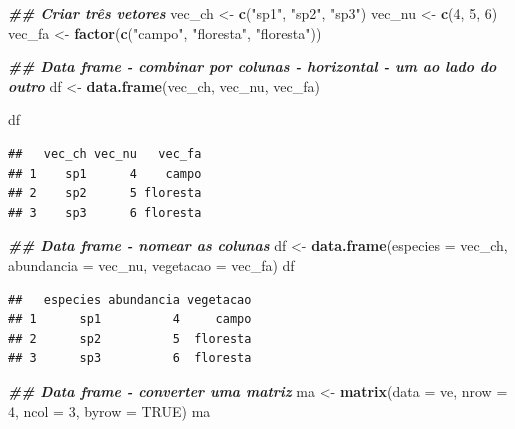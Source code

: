 \documentclass[
]{article}
\newenvironment{Shaded}{\begin{snugshade}}{\end{snugshade}}
\newcommand{\AttributeTok}[1]{\textcolor[rgb]{0.13,0.29,0.53}{#1}}
\newcommand{\ConstantTok}[1]{\textcolor[rgb]{0.56,0.35,0.01}{#1}}
\newcommand{\DecValTok}[1]{\textcolor[rgb]{0.00,0.00,0.81}{#1}}
\newcommand{\DocumentationTok}[1]{\textcolor[rgb]{0.56,0.35,0.01}{\textbf{\textit{#1}}}}
\newcommand{\FunctionTok}[1]{\textcolor[rgb]{0.13,0.29,0.53}{\textbf{#1}}}
\newcommand{\NormalTok}[1]{#1}
\newcommand{\OtherTok}[1]{\textcolor[rgb]{0.56,0.35,0.01}{#1}}
\newcommand{\StringTok}[1]{\textcolor[rgb]{0.31,0.60,0.02}{#1}}
\begin{document}
\begin{Shaded}
\begin{Highlighting}[]
\DocumentationTok{\#\# Criar três vetores}
\NormalTok{vec\_ch }\OtherTok{\textless{}{-}} \FunctionTok{c}\NormalTok{(}\StringTok{"sp1"}\NormalTok{, }\StringTok{"sp2"}\NormalTok{, }\StringTok{"sp3"}\NormalTok{)}
\NormalTok{vec\_nu }\OtherTok{\textless{}{-}} \FunctionTok{c}\NormalTok{(}\DecValTok{4}\NormalTok{, }\DecValTok{5}\NormalTok{, }\DecValTok{6}\NormalTok{)}
\NormalTok{vec\_fa }\OtherTok{\textless{}{-}} \FunctionTok{factor}\NormalTok{(}\FunctionTok{c}\NormalTok{(}\StringTok{"campo"}\NormalTok{, }\StringTok{"floresta"}\NormalTok{, }\StringTok{"floresta"}\NormalTok{))}

\DocumentationTok{\#\# Data frame {-} combinar por colunas {-} horizontal {-} um ao lado do outro}
\NormalTok{df }\OtherTok{\textless{}{-}} \FunctionTok{data.frame}\NormalTok{(vec\_ch, vec\_nu, vec\_fa)}

\NormalTok{df}
\end{Highlighting}
\end{Shaded}

\begin{verbatim}
##   vec_ch vec_nu   vec_fa
## 1    sp1      4    campo
## 2    sp2      5 floresta
## 3    sp3      6 floresta
\end{verbatim}

\begin{Shaded}
\begin{Highlighting}[]
\DocumentationTok{\#\# Data frame {-} nomear as colunas}
\NormalTok{df }\OtherTok{\textless{}{-}} \FunctionTok{data.frame}\NormalTok{(}\AttributeTok{especies =}\NormalTok{ vec\_ch, }
                 \AttributeTok{abundancia =}\NormalTok{ vec\_nu, }
                 \AttributeTok{vegetacao =}\NormalTok{ vec\_fa)}
\NormalTok{df}
\end{Highlighting}
\end{Shaded}

\begin{verbatim}
##   especies abundancia vegetacao
## 1      sp1          4     campo
## 2      sp2          5  floresta
## 3      sp3          6  floresta
\end{verbatim}

\begin{Shaded}
\begin{Highlighting}[]
\DocumentationTok{\#\# Data frame {-} converter uma matriz}
\NormalTok{ma }\OtherTok{\textless{}{-}} \FunctionTok{matrix}\NormalTok{(}\AttributeTok{data =}\NormalTok{ ve, }\AttributeTok{nrow =} \DecValTok{4}\NormalTok{, }\AttributeTok{ncol =} \DecValTok{3}\NormalTok{, }\AttributeTok{byrow =} \ConstantTok{TRUE}\NormalTok{)}
\NormalTok{ma}
\end{Highlighting}
\end{Shaded}
\end{document}
